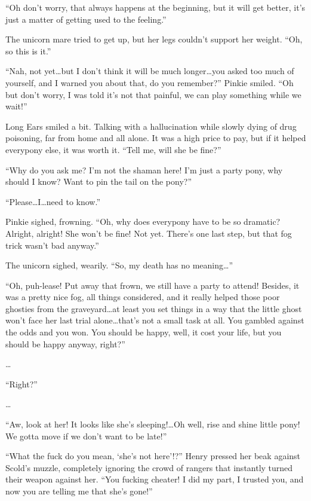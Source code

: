 ``Oh don't worry, that always happens at the beginning, but it will get better, it's just a matter of getting used to the feeling.''

The unicorn mare tried to get up, but her legs couldn't support her weight. ``Oh, so this is it.''

``Nah, not yet\dots but I don't think it will be much longer\dots you asked too much of yourself, and I warned you about that, do you remember?'' Pinkie smiled. ``Oh but don't worry, I was told it's not that painful, we can play something while we wait!''

Long Ears smiled a bit. Talking with a hallucination while slowly dying of drug poisoning, far from home and all alone. It was a high price to pay, but if it helped everypony else, it was worth it. ``Tell me, will she be fine?''

``Why do you ask me? I'm not the shaman here! I'm just a party pony, why should I know? Want to pin the tail on the pony?''

``Please\dots I\dots need to know.''

Pinkie sighed, frowning. ``Oh, why does everypony have to be so dramatic? Alright, alright! She won't be fine! Not yet. There's one last step, but that fog trick wasn't bad anyway.''

The unicorn sighed, wearily. ``So, my death has no meaning\dots''

``Oh, puh-lease! Put away that frown, we still have a party to attend! Besides, it was a pretty nice fog, all things considered, and it really helped those poor ghosties from the graveyard\dots at least you set things in a way that the little ghost won't face her last trial alone\dots that's not a small task at all. You gambled against the odds and you won. You should be happy, well, it cost your life, but you should be happy anyway, right?''

\ldots{}

``Right?''

\ldots{}

``Aw, look at her! It looks like she's sleeping!\dots Oh well, rise and shine little pony! We gotta move if we don't want to be late!''

\horizonline


``What the fuck do you mean, `she's not here'!?'' Henry pressed her beak against Scold's muzzle, completely ignoring the crowd of rangers that instantly turned their weapon against her. ``You fucking cheater! I did my part, I trusted you, and now you are telling me that she's gone!''

